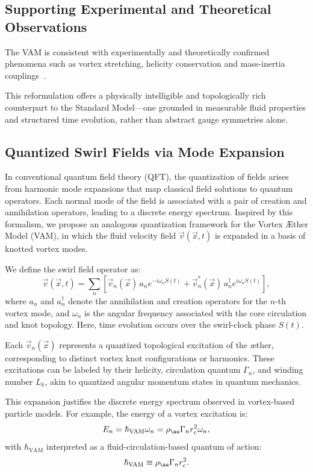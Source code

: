 \subsection*{Supporting Experimental and Theoretical Observations}
The VAM is consistent with experimentally and theoretically confirmed phenomena such as vortex stretching, helicity conservation and mass-inertia couplings~\cite{batchelor1953, vinen2002, bewley2008, moffatt1969, kleckner2013, scheeler2014, bartlett1986}.

This reformulation offers a physically intelligible and topologically rich counterpart to the Standard Model---one grounded in measurable fluid properties and structured time evolution, rather than abstract gauge symmetries alone.

\subsection{Quantized Swirl Fields via Mode Expansion}

In conventional quantum field theory (QFT), the quantization of fields arises from harmonic mode expansions that map classical field solutions to quantum operators. Each normal mode of the field is associated with a pair of creation and annihilation operators, leading to a discrete energy spectrum. Inspired by this formalism, we propose an analogous quantization framework for the Vortex \AE{}ther Model (VAM), in which the fluid velocity field $\vec{v}(\vec{x}, t)$ is expanded in a basis of knotted vortex modes.

We define the swirl field operator as:
\begin{equation}
\vec{v}(\vec{x}, t) = \sum_n \left[ \vec{v}_n(\vec{x})\, a_n e^{-i\omega_n S(t)} + \vec{v}_n^*(\vec{x})\, a_n^\dagger e^{i\omega_n S(t)} \right],
\end{equation}
where $a_n$ and $a_n^\dagger$ denote the annihilation and creation operators for the $n$-th vortex mode, and $\omega_n$ is the angular frequency associated with the core circulation and knot topology. Here, time evolution occurs over the swirl-clock phase $S(t)$.

Each $\vec{v}_n(\vec{x})$ represents a quantized topological excitation of the \ae{}ther, corresponding to distinct vortex knot configurations or harmonics. These excitations can be labeled by their helicity, circulation quantum $\Gamma_n$, and winding number $L_k$, akin to quantized angular momentum states in quantum mechanics.

This expansion justifies the discrete energy spectrum observed in vortex-based particle models. For example, the energy of a vortex excitation is:
\begin{equation}
E_n = \hbar_{\text{VAM}} \omega_n = \rho_{\ae} \Gamma_n r_c^2 \omega_n,
\end{equation}
with $\hbar_{\text{VAM}}$ interpreted as a fluid-circulation-based quantum of action:
\begin{equation}
\hbar_{\text{VAM}} \equiv \rho_{\ae} \Gamma_n r_c^2.
\end{equation}

